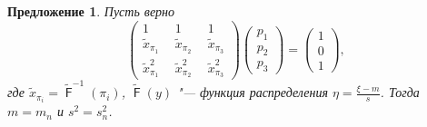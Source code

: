 \documentclass[12pt]{article}
\newtheorem{proposition}[theorem]{Предложение}
\DeclareMathOperator{\F}{\mathsf{F}}
\begin{document}
	
	\begin{proposition}\label{pr1}
		Пусть верно 
		\begin{equation}
			\begin{pmatrix} 
				1&1&1\\ 
				\tilde{x}_{\pi_{1}}~~ &  \tilde{x}_{\pi_{2}}~~  & \tilde{x}_{\pi_{3}} \\ 
				\tilde{x}_{\pi_{1}}^{2}~~&\tilde{x}_{\pi_{2}}^{2}~~  &\tilde{x}_{\pi_{3}}^{2}
			\end{pmatrix}
			\begin{pmatrix}p_{1}\\p_{2}\\ p_{3}\end{pmatrix}= \begin{pmatrix}1\\0\\1 \end{pmatrix},\label{4}
		\end{equation}
	где $\tilde{x}_{\pi_{i}} = \tilde{\F}^{-1}(\pi_{i})$, $\tilde{\F}(y)$ "--- функция распределения $\displaystyle{\eta = \frac{\xi-m}{s}}$. Тогда $m=m_{n}$ и $s^{2} = s_{n}^{2}$.
	\end{proposition}
\end{document}
